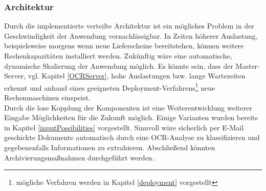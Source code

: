 \subsubsection{Architektur}
Durch die implementierte verteilte Architektur ist ein mögliches Problem in der Geschwindigkeit der Anwendung vernachlässigbar. In Zeiten höherer Auslastung, beispielsweise morgens wenn neue Lieferscheine bereitstehen, können weitere Rechenkapazitäten installiert werden. Zukünftig wäre eine automatische, dynamische Skalierung der Anwendung möglich. Es könnte sein, dass der Master-Server, vgl. Kapitel \ref{OCRServer}, hohe Auslastungen bzw. lange Wartezeiten erkennt und anhand eines geeigneten Deployment-Verfahrens\footnote{{} mögliche Verfahren werden in Kapitel \ref{deployment} vorgestellt} neue Rechenmaschinen einspeist.\\
Durch die lose Kopplung der Komponenten ist eine Weiterentwicklung weiterer Eingabe Möglichkeiten für die Zukunft möglich. Einige Varianten wurden bereits in Kapitel \ref{inputPossibilities} vorgestellt. Sinnvoll wäre sicherlich per E-Mail geschickte Dokumente automatisch durch eine \ac{OCR}-Analyse zu klassifizieren und gegebenenfalls Informationen zu extrahieren. Abschließend könnten Archivierungsmaßnahmen durchgeführt werden.

